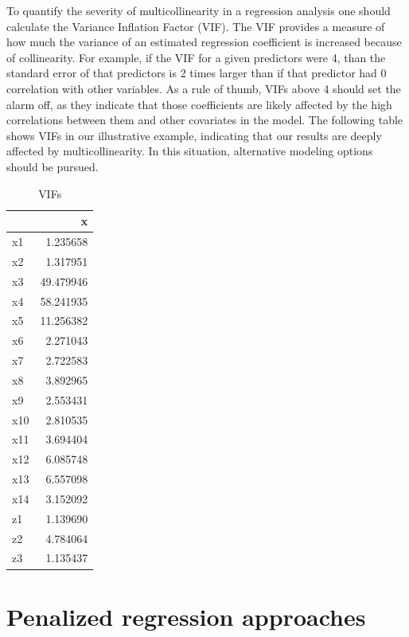 \documentclass[
]{book}
\begin{document}
To quantify the severity of multicollinearity in a regression analysis one should calculate the Variance Inflation Factor (VIF). The VIF provides a measure of how much the variance of an estimated regression coefficient is increased because of collinearity. For example, if the VIF for a given predictors were 4, than the standard error of that predictors is 2 times larger than if that predictor had 0 correlation with other variables. As a rule of thumb, VIFs above 4 should set the alarm off, as they indicate that those coefficients are likely affected by the high correlations between them and other covariates in the model. The following table shows VIFs in our illustrative example, indicating that our results are deeply affected by multicollinearity. In this situation, alternative modeling options should be pursued.

\begin{table}

\caption{\label{tab:unnamed-chunk-15}VIFs}
\centering
\begin{tabular}[t]{l|r}
\hline
  & x\\
\hline
x1 & 1.235658\\
\hline
x2 & 1.317951\\
\hline
x3 & 49.479946\\
\hline
x4 & 58.241935\\
\hline
x5 & 11.256382\\
\hline
x6 & 2.271043\\
\hline
x7 & 2.722583\\
\hline
x8 & 3.892965\\
\hline
x9 & 2.553431\\
\hline
x10 & 2.810535\\
\hline
x11 & 3.694404\\
\hline
x12 & 6.085748\\
\hline
x13 & 6.557098\\
\hline
x14 & 3.152092\\
\hline
z1 & 1.139690\\
\hline
z2 & 4.784064\\
\hline
z3 & 1.135437\\
\hline
\end{tabular}
\end{table}

\hypertarget{penalized-regression-approaches}{%
\section{Penalized regression approaches}\label{penalized-regression-approaches}}
\end{document}
